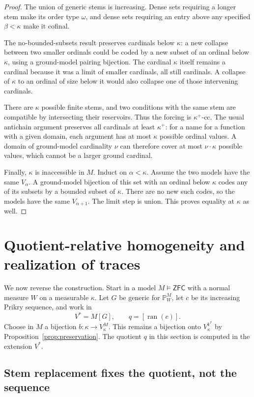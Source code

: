 \documentclass[11pt,letterpaper]{article}
\theoremstyle{definition}
\numberwithin{equation}{section}
\newcommand{\ZFC}{\mathsf{ZFC}}
\newcommand{\ran}{\operatorname{ran}}
\newcommand{\PP}{\mathbb P}
\begin{document}
\begin{proof}
The union of generic stems is increasing. Dense sets requiring a longer
stem make its order type $\omega$, and dense sets requiring an entry
above any specified $\beta<\kappa$ make it cofinal.

The no-bounded-subsets result preserves cardinals below $\kappa$:
a new collapse between two smaller ordinals could be coded by a new
subset of an ordinal below $\kappa$, using a ground-model pairing
bijection. The cardinal $\kappa$ itself remains a cardinal because it
was a limit of smaller cardinals, all still cardinals. A collapse of
$\kappa$ to an ordinal of size below it would also collapse one of
those intervening cardinals.

There are $\kappa$ possible finite stems, and two conditions with the
same stem are compatible by intersecting their reservoirs. Thus the
forcing is $\kappa^+$-cc. The usual antichain argument preserves all
cardinals at least $\kappa^+$: for a name for a function with a given
domain, each argument has at most $\kappa$ possible ordinal values.
A domain of ground-model cardinality $\nu$ can therefore cover at
most $\nu\cdot\kappa$ possible values, which cannot be a larger ground
cardinal.

Finally, $\kappa$ is inaccessible in $M$. Induct on $\alpha<\kappa$.
Assume the two models have the same $V_\alpha$. A ground-model
bijection of this set with an ordinal below $\kappa$ codes any of its
subsets by a bounded subset of $\kappa$. There are no new such codes,
so the models have the same $V_{\alpha+1}$. The limit step is union.
This proves equality at $\kappa$ as well.
\end{proof}

\section{Quotient-relative homogeneity and realization of traces}\label{sec:homogeneity}

We now reverse the construction. Start in a model $M\models\ZFC$ with
a normal measure $W$ on a measurable $\kappa$. Let $G$ be generic for
$\PP_W^M$, let $c$ be its increasing Prikry sequence, and work in
\[
 V^*=M[G],\qquad q=[\ran(c)].
\]
Choose in $M$ a bijection $b:\kappa\to V_\kappa^M$. This remains a
bijection onto $V_\kappa^{V^*}$ by Proposition~\ref{prop:preservation}.
The quotient $q$ in this section is computed in the extension $V^*$.

\subsection{Stem replacement fixes the quotient, not the sequence}
\end{document}
